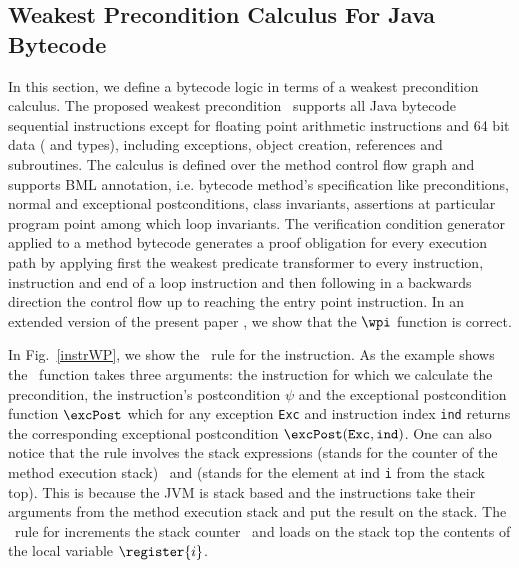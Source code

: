 \subsection{Weakest Precondition Calculus For Java Bytecode}\label{wpbc}
In this section, we define a bytecode logic in terms of a weakest precondition calculus. The proposed weakest precondition \wpi \ supports all Java bytecode sequential instructions except for floating point arithmetic instructions and 64 bit data ( and  types), including exceptions, object creation,
 references and subroutines. The calculus is defined over the method control flow graph and supports BML annotation,
 i.e. bytecode method's specification like preconditions, normal and exceptional postconditions, class invariants,
 assertions at particular program point among which loop invariants. The verification condition generator applied to a method 
bytecode generates a proof obligation for every execution path
 by applying first the weakest predicate transformer to every  instruction,
  instruction and end of a loop instruction and then following in a backwards direction the control
 flow up to reaching the entry point instruction.
 In an extended version of the present paper \cite{JBL05MP}, we show that the $\wpi$ function is correct.

 In Fig.~\ref{instrWP}, we show the \wpi \ rule for the  instruction.
 As the example shows the \wpi \ function takes three arguments:
the instruction for which we calculate the precondition, 
the instruction's postcondition $\psi$ and the exceptional postcondition function $\excPost$ which for any exception \texttt{Exc} and 
instruction index \texttt{ind} returns the
corresponding exceptional postcondition $\excPost(\texttt{Exc}, \tt{ind})$. One can also notice that the rule involves the stack expressions \counter 
(stands for the counter of the method execution stack) \ and  (stands for the element at ind \texttt{i} from the stack top).
 This is because the JVM is stack based and the instructions take their arguments from the method execution stack and 
 put the result on the stack.
 The \wpi \ rule for   increments the stack counter \counter \ and loads on the stack top the contents
 of the local variable $\register{i}$. 




